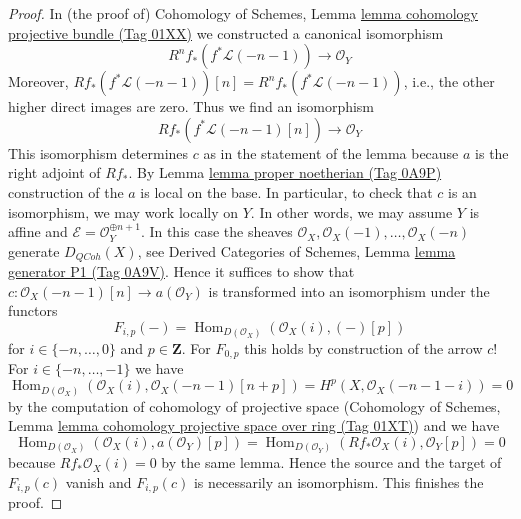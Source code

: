 \documentclass{amsart}
\theoremstyle{plain}
\theoremstyle{definition}
\theoremstyle{remark}
\numberwithin{equation}{subsection}
\def\Hom{\mathop{\mathrm{Hom}}\nolimits}
\def\QCoh{\mathit{QCoh}}
\begin{document}
\begin{proof}
In (the proof of) Cohomology of Schemes, Lemma
\href{https://stacks.math.columbia.edu/tag/01XX}{lemma cohomology projective bundle (Tag 01XX)}
we constructed a canonical isomorphism
$$
R^nf_*(f^*\mathcal{L}(-n - 1)) \longrightarrow \mathcal{O}_Y
$$
Moreover, $Rf_*(f^*\mathcal{L}(-n - 1))[n] = R^nf_*(f^*\mathcal{L}(-n - 1))$,
i.e., the other higher direct images are zero. Thus we find an isomorphism
$$
Rf_*(f^*\mathcal{L}(-n - 1)[n]) \longrightarrow \mathcal{O}_Y
$$
This isomorphism determines $c$ as in the statement of the lemma
because $a$ is the right adjoint of $Rf_*$.
By Lemma \href{https://stacks.math.columbia.edu/tag/0A9P}{lemma proper noetherian (Tag 0A9P)} construction of the $a$
is local on the base. In particular, to check that
$c$ is an isomorphism, we may work locally on $Y$.
In other words, we may assume $Y$ is affine and
$\mathcal{E} = \mathcal{O}_Y^{\oplus n + 1}$.
In this case the sheaves $\mathcal{O}_X, \mathcal{O}_X(-1), \ldots,
\mathcal{O}_X(-n)$ generate $D_\QCoh(X)$, see
Derived Categories of Schemes, Lemma \href{https://stacks.math.columbia.edu/tag/0A9V}{lemma generator P1 (Tag 0A9V)}.
Hence it suffices to show that
$c : \mathcal{O}_X(-n - 1)[n] \to a(\mathcal{O}_Y)$
is transformed into an isomorphism under the functors
$$
F_{i, p}(-) = \Hom_{D(\mathcal{O}_X)}(\mathcal{O}_X(i), (-)[p])
$$
for $i \in \{-n, \ldots, 0\}$ and $p \in \mathbf{Z}$.
For $F_{0, p}$ this holds by construction of the arrow $c$!
For $i \in \{-n, \ldots, -1\}$ we have
$$
\Hom_{D(\mathcal{O}_X)}(\mathcal{O}_X(i), \mathcal{O}_X(-n - 1)[n + p]) =
H^p(X, \mathcal{O}_X(-n - 1 - i)) = 0
$$
by the computation of cohomology of projective space
(Cohomology of Schemes, Lemma
\href{https://stacks.math.columbia.edu/tag/01XT}{lemma cohomology projective space over ring (Tag 01XT)})
and we have
$$
\Hom_{D(\mathcal{O}_X)}(\mathcal{O}_X(i), a(\mathcal{O}_Y)[p]) =
\Hom_{D(\mathcal{O}_Y)}(Rf_*\mathcal{O}_X(i), \mathcal{O}_Y[p]) = 0
$$
because $Rf_*\mathcal{O}_X(i) = 0$ by the same lemma.
Hence the source and the target of $F_{i, p}(c)$ vanish
and $F_{i, p}(c)$ is necessarily an isomorphism.
This finishes the proof.
\end{proof}
\end{document}
